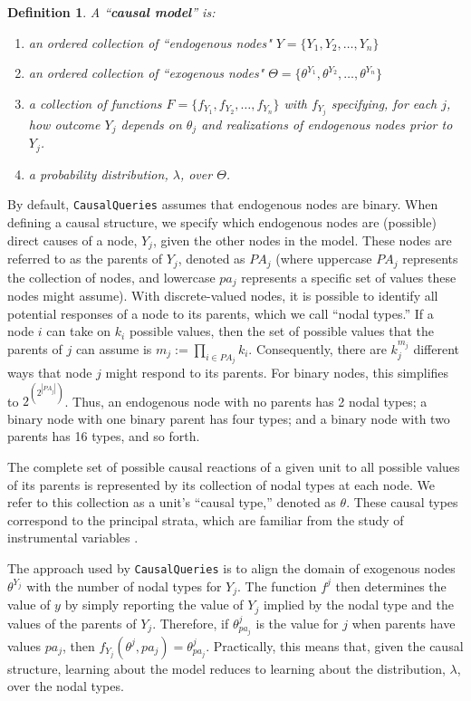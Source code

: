 \documentclass[
  11pt,
  article]{jss}
\newtheorem{definition}{Definition}
\begin{document}
\begin{definition}
  
  A ``\textbf{causal model}'' is:
  \begin{enumerate}
    \item an ordered collection of ``endogenous nodes" $Y = \{Y_1, Y_2, \dots, Y_n\}$
    \item an ordered collection of ``exogenous nodes" $\Theta = \{\theta^{Y_1}, \theta^{Y_2}, \dots, \theta^{Y_n}\}$
    \item a collection of functions $F = \{f_{Y_1}, f_{Y_2}, \dots, f_{Y_n}\}$ with $f_{Y_j}$ specifying, for each $j$, how outcome $Y_j$ depends on $\theta_j$ and realizations of endogenous nodes prior to $Y_j$.
    \item a probability distribution, $\lambda$, over $\Theta$.
  \end{enumerate}
  
\end{definition}

By default, \texttt{CausalQueries} assumes that endogenous nodes are
binary. When defining a causal structure, we specify which endogenous
nodes are (possible) direct causes of a node, \(Y_j\), given the other
nodes in the model. These nodes are referred to as the parents of
\(Y_j\), denoted as \(PA_j\) (where uppercase \(PA_j\) represents the
collection of nodes, and lowercase \(pa_j\) represents a specific set of
values these nodes might assume). With discrete-valued nodes, it is
possible to identify all potential responses of a node to its parents,
which we call ``nodal types.'' If a node \(i\) can take on \(k_i\)
possible values, then the set of possible values that the parents of
\(j\) can assume is \(m_j :=\prod_{i\in PA_j}k_i\). Consequently, there
are \(k_j^{m_j}\) different ways that node \(j\) might respond to its
parents. For binary nodes, this simplifies to
\(2^{\left(2^{|PA_j|}\right)}\). Thus, an endogenous node with no
parents has 2 nodal types; a binary node with one binary parent has four
types; and a binary node with two parents has 16 types, and so forth.

The complete set of possible causal reactions of a given unit to all
possible values of its parents is represented by its collection of nodal
types at each node. We refer to this collection as a unit's ``causal
type,'' denoted as \(\theta\). These causal types correspond to the
principal strata, which are familiar from the study of instrumental
variables \citep{frangakis_principal_2002}.

The approach used by \texttt{CausalQueries} is to align the domain of
exogenous nodes \(\theta^{Y_j}\) with the number of nodal types for
\(Y_j\). The function \(f^j\) then determines the value of \(y\) by
simply reporting the value of \(Y_j\) implied by the nodal type and the
values of the parents of \(Y_j\). Therefore, if \(\theta^j_{pa_j}\) is
the value for \(j\) when parents have values \(pa_j\), then
\(f_{Y_j}(\theta^{j}, pa_j) = \theta^j_{pa_j}\). Practically, this means
that, given the causal structure, learning about the model reduces to
learning about the distribution, \(\lambda\), over the nodal types.
\end{document}
